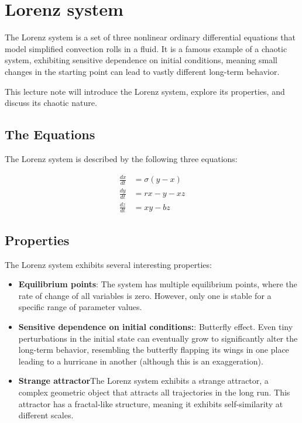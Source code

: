 \documentclass[12pt,a4paper]{article}
\begin{document}
\section{Lorenz system}

The Lorenz system is a set of three nonlinear ordinary differential equations that model simplified convection rolls in a fluid. It is a famous example of a chaotic system, exhibiting sensitive dependence on initial conditions, meaning small changes in the starting point can lead to vastly different long-term behavior. 

This lecture note will introduce the Lorenz system, explore its properties, and discuss its chaotic nature. 

\subsection{The Equations}

The Lorenz system is described by the following three equations:

\begin{align*}
\frac{dx}{dt} &= \sigma (y - x) \\
\frac{dy}{dt}  &= rx - y - xz \\
\frac{dz}{dt}  &= xy - bz
\end{align*}


\subsection{Properties}

The Lorenz system exhibits several interesting properties:
\begin{itemize}
    \item \textbf{Equilibrium points}: The system has multiple equilibrium points, where the rate of change of all variables is zero. However, only one is stable for a specific range of parameter values.
    \item \textbf{Sensitive dependence on initial conditions:}: Butterfly effect. Even tiny perturbations in the initial state can eventually grow to significantly alter the long-term behavior, resembling the butterfly flapping its wings in one place leading to a hurricane in another (although this is an exaggeration).
    \item \textbf{Strange attractor}The Lorenz system exhibits a strange attractor, a complex geometric object that attracts all trajectories in the long run. This attractor has a fractal-like structure, meaning it exhibits self-similarity at different scales. 
\end{itemize}
\end{document}
